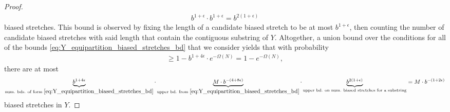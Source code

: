 \documentclass[11pt]{amsart}
\numberwithin{equation}{section}
\numberwithin{equation}{section}
\newcommand{\1}{\mathbbm{1}}
\theoremstyle{definition}
\begin{document}
\begin{proof}
    \begin{align*}
        b^{1+\epsilon} \cdot b^{1+\epsilon} = b^{2\left( 1+\epsilon \right)}
    \end{align*}
    biased stretches. This bound is observed by fixing the length of a candidate biased stretch to be at most $b^{1+\epsilon}$, then counting the number of candidate biased stretches with said length that contain the contiguous substring of $Y$. Altogether, a union bound over the conditions for all of the bounds \eqref{eq:Y_equipartition_biased_stretches_bd} that we consider yields that with probability
    \begin{align*}
        \geq 1 - b^{1+4\epsilon} \cdot e^{-\Omega(N)} = 1-e^{-\Omega(N)},
    \end{align*}
    there are at most
    \begin{align*}
        \underbrace{b^{1+4\epsilon}}_{\text{num. bds. of form } \eqref{eq:Y_equipartition_biased_stretches_bd}} \cdot \underbrace{M \cdot b^{-(4+8\epsilon)}}_{\text{upper bd. from } \eqref{eq:Y_equipartition_biased_stretches_bd}} \cdot \underbrace{b^{2\left( 1+\epsilon \right)}}_{\text{upper bd. on num. biased stretches for a substring}} = M \cdot b^{-(1+2\epsilon)}
    \end{align*}
    biased stretches in $Y$.
\end{proof}
\end{document}
